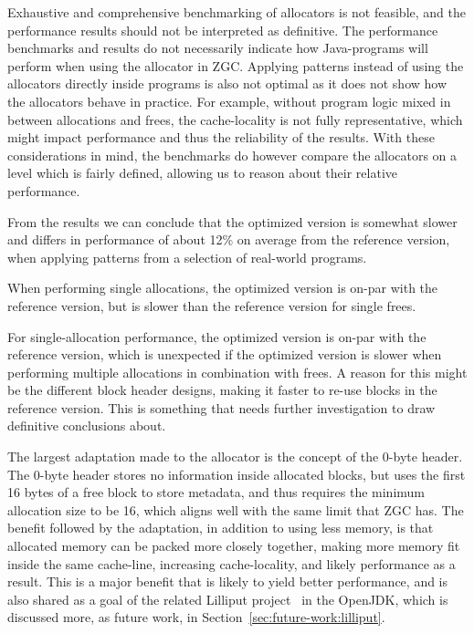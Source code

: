 


Exhaustive and comprehensive benchmarking of allocators is not feasible, and the performance results should not be interpreted as definitive. The performance benchmarks and results do not necessarily indicate how Java-programs will perform when using the allocator in ZGC. Applying patterns instead of using the allocators directly inside programs is also not optimal as it does not show how the allocators behave in practice. For example, without program logic mixed in between allocations and frees, the cache-locality is not fully representative, which might impact performance and thus the reliability of the results. With these considerations in mind, the benchmarks do however compare the allocators on a level which is fairly defined, allowing us to reason about their relative performance. 

From the results we can conclude that the optimized version is somewhat slower and differs in performance of about 12\% on average from the reference version, when applying patterns from a selection of real-world programs. 

When performing single allocations, the optimized version is on-par with the reference version, but is slower than the reference version for single frees.


For single-allocation performance, the optimized version is on-par with the reference version, which is unexpected if the optimized version is slower when performing multiple allocations in combination with frees. A reason for this might be the different block header designs, making it faster to re-use blocks in the reference version. This is something that needs further investigation to draw definitive conclusions about.

The largest adaptation made to the allocator is the concept of the 0-byte header. The 0-byte header stores no information inside allocated blocks, but uses the first 16 bytes of a free block to store metadata, and thus requires the minimum allocation size to be 16, which aligns well with the same limit that ZGC has. The benefit followed by the adaptation, in addition to using less memory, is that allocated memory can be packed more closely together, making more memory fit inside the same cache-line, increasing cache-locality, and likely performance as a result. This is a major benefit that is likely to yield better performance, and is also shared as a goal of the related Lilliput project~\cite{lilliput} in the OpenJDK, which is discussed more, as future work, in Section~\ref{sec:future-work:lilliput}.


